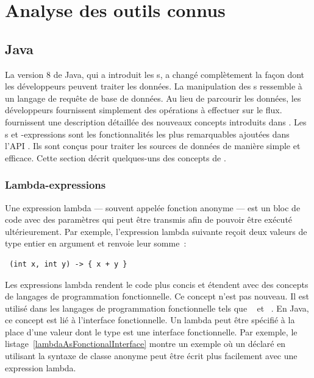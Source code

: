 
\chapter{Analyse des outils connus}
\label{outils_connus}

\section{Java}

La version 8 de Java, qui a introduit les s, a chang\'e compl\`etement la façon dont les d\'eveloppeurs peuvent traiter les donn\'ees. La manipulation des s ressemble \`a un langage de requ\^ete de base de donn\'ees. Au lieu de parcourir les donn\'ees, les d\'eveloppeurs fournissent simplement des op\'erations \`a effectuer sur le flux. \cite{urma2014java} fournissent une description d\'etaill\'ee des nouveaux concepts introduits dans . Les  s et -expressions sont les fonctionnalit\'es les plus remarquables ajout\'ees dans l'API \citep{javaStreamAPI}. Ils sont con\c{c}us pour traiter les sources de donn\'ees de mani\`ere simple et efficace. Cette section d\'ecrit quelques-uns des concepts de .


\subsection{Lambda-expressions}

Une expression lambda --- souvent appel\'ee fonction anonyme --- est un bloc de code avec des param\`etres qui peut \^etre transmis afin de pouvoir \^etre ex\'ecut\'e ult\'erieurement. Par exemple, l'expression lambda suivante re\c{c}oit deux valeurs de type entier en argument et renvoie leur somme~:
{\small
\begin{lstlisting}
 (int x, int y) -> { x + y }
\end{lstlisting}
} 




Les expressions lambda rendent le code plus concis et \'etendent  avec des concepts de langages de programmation fonctionnelle. Ce concept n'est pas nouveau. Il est utilis\'e dans les langages de programmation fonctionnelle tels que ~\citep{hutton2016programming} et ~\citep{steele1990common}. En Java, ce concept est li\'e \`a l'interface fonctionnelle. Un lambda peut \^etre sp\'ecifi\'e \`a la place d'une valeur dont le type est une interface fonctionnelle. Par exemple, le listage~\ref{lambdaAsFonctionalInterface} montre un exemple o\`u un  d\'eclar\'e en utilisant la syntaxe de classe anonyme peut \^etre \'ecrit plus facilement avec une expression lambda.


